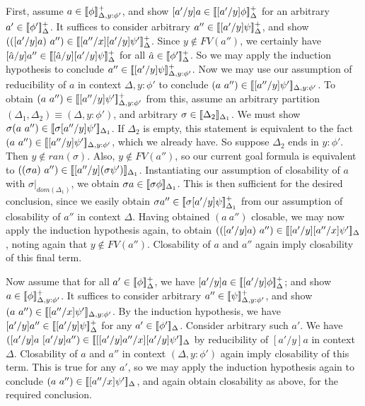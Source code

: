 \documentclass[copyright]{eptcs}
\newcommand{\interp}[1]{[\negthinspace[#1]\negthinspace]}
\begin{document}
\noindent First, assume $a\in\interp{\phi}^+_{\Delta,y:\phi'}$, and
show $[a'/y]a\in\interp{[a'/y] \phi}^+_{\Delta}$ for an arbitrary
$a'\in\interp{\phi'}^+_\Delta$.  It suffices to consider arbitrary
$a''\in\interp{[a'/y]\psi}^+_\Delta$, and show
$(([a'/y]a)\ a'')\in\interp{[a''/x][a'/y]\psi'}^+_\Delta$.  Since
$y\not\in\textit{FV}(a'')$, we certainly have
$[\hat{a}/y]a''\in\interp{[\hat{a}/y][a'/y]\psi}^+_\Delta$ for all
$\hat{a}\in\interp{\phi'}^+_\Delta$.  So we may apply the induction
hypothesis to conclude $a''\in\interp{[a'/y]\psi}^+_{\Delta,y:\phi'}$.
Now we may use our assumption of reducibility of $a$ in context
$\Delta,y:\phi'$ to conclude
$(a\ a'')\in\interp{[a''/y]\psi'}_{\Delta,y:\phi'}$.  To obtain
$(a\ a'')\in\interp{[a''/y]\psi'}^+_{\Delta,y:\phi'}$ from this,
assume an arbitrary partition
$(\Delta_1,\Delta_2)\equiv(\Delta,y:\phi')$, and arbitrary
$\sigma\in\interp{\Delta_2}_{\Delta_1}$.  We must show $\sigma
(a\ a'')\in\interp{\sigma [a''/y]\psi'}_{\Delta_1}$.  If $\Delta_2$ is
empty, this statement is equivalent to the fact
$(a\ a'')\in\interp{[a''/y]\psi'}_{\Delta,y:\phi'}$, which we already
have.  So suppose $\Delta_2$ ends in $y:\phi'$.  Then
$y\not\in\textit{ran}(\sigma)$.  Also, $y\not\in\textit{FV}(a'')$, so
our current goal formula is equivalent to $((\sigma
a)\ a'')\in\interp{[a''/y](\sigma\psi')}_{\Delta_1}$.  Instantiating
our assumption of closability of $a$ with
$\sigma|_{\textit{dom}(\Delta_1)}$, we obtain $\sigma
a\in\interp{\sigma\phi}_{\Delta_1}$.  This is then sufficient for the
desired conclusion, since we easily obtain $\sigma
a''\in\interp{\sigma [a'/y]\psi}^+_{\Delta_1}$ from our assumption of
closability of $a''$ in context $\Delta$.  Having obtained $(a\ a'')$
closable, we may now apply the induction hypothesis again, to obtain
$(([a'/y]a)\ a'')\in\interp{[a'/y][a''/x]\psi'}_\Delta$, noting again
that $y\not\in\textit{FV}(a'')$.  Closability of $a$ and $a''$ again
imply closability of this final term.

Now assume that for all $a'\in\interp{\phi}^+_\Delta$, we have
$[a'/y]a\in\interp{[a'/y] \phi}^+_{\Delta}$; and show
$a\in\interp{\phi}^+_{\Delta,y:\phi'}$.  It suffices to consider
arbitrary $a''\in\interp{\psi}^+_{\Delta,y:\phi'}$, and show
$(a\ a'')\in\interp{[a''/x]\psi'}_{\Delta,y:\phi'}$.  By the induction
hypothesis, we have $[a'/y]a''\in\interp{[a'/y]\psi}^+_\Delta$ for any
$a'\in\interp{\phi'}_\Delta$.  Consider arbitrary such $a'$.  We have
$([a'/y]a\ [a'/y]a'')\in\interp{[[a'/y]a''/x][a'/y]\psi'}_\Delta$ by
reducibility of $[a'/y]a$ in context $\Delta$.  Closability of $a$ and
$a''$ in context $(\Delta,y:\phi')$ again imply closability of this
term. This is true for any $a'$, so we may apply the induction
hypothesis again to conclude
$(a\ a'')\in\interp{[a''/x]\psi'}_\Delta$, and again obtain
closability as above, for the required conclusion.
\end{document}

